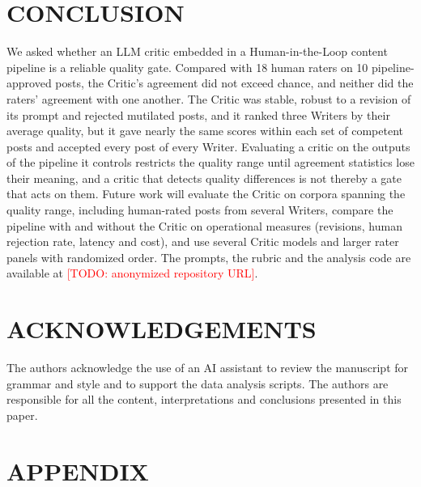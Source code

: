 \documentclass[a4paper,twoside]{article}
\newcommand{\TODO}[1]{\textcolor{red}{[TODO: #1]}}
\newcommand{\NRaters}{18}
\newcommand{\NPosts}{10}
\begin{document}
\section{\uppercase{Conclusion}}
\label{sec:conclusion}

We asked whether an LLM critic embedded in a Human-in-the-Loop content pipeline is a reliable quality gate. Compared with \NRaters{} human raters on \NPosts{} pipeline-approved posts, the Critic's agreement did not exceed chance, and neither did the raters' agreement with one another. The Critic was stable, robust to a revision of its prompt and rejected mutilated posts, and it ranked three Writers by their average quality, but it gave nearly the same scores within each set of competent posts and accepted every post of every Writer. Evaluating a critic on the outputs of the pipeline it controls restricts the quality range until agreement statistics lose their meaning, and a critic that detects quality differences is not thereby a gate that acts on them. Future work will evaluate the Critic on corpora spanning the quality range, including human-rated posts from several Writers, compare the pipeline with and without the Critic on operational measures (revisions, human rejection rate, latency and cost), and use several Critic models and larger rater panels with randomized order. The prompts, the rubric and the analysis code are available at \TODO{anonymized repository URL}.

\section*{\uppercase{Acknowledgements}}

The authors acknowledge the use of an AI assistant to review the manuscript for grammar and style and to support the data analysis scripts. The authors are responsible for all the content, interpretations and conclusions presented in this paper.


{\small
}

\section*{\uppercase{Appendix}}
\end{document}
